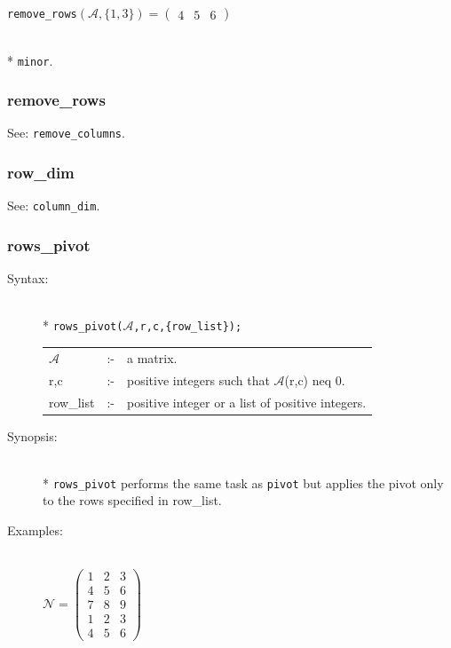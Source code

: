 {\begin{description}
\texttt{remove\_rows}\((\mathcal{A},\{1,3\}) =
        \begin{pmatrix} 4 & 5 & 6 \end{pmatrix}\)

\item[Related functions:]\mbox{}\\*
\texttt{minor}.
\end{description}


\subsubsection{remove\_rows}
\label{linalg:remove_rows}
\hypertarget{operator:REMOVE_ROWS}{}
See: \texttt{remove\_columns}.


\subsubsection{row\_dim}
\label{linalg:row_dim}
\hypertarget{operator:ROW_DIM}{}

See: \texttt{column\_dim}.


\subsubsection{rows\_pivot}
\label{linalg:rows_pivot}
\hypertarget{operator:ROWS_PIVOT}{}

\begin{description}
\item[Syntax:]\mbox{}\\*
{\tt rows\_pivot($\mathcal{A}$,r,c,\{row\_list\});}\\[2mm]
\begin{tabular}{l l l}
$\mathcal{A}$ &:-& a matrix. \\
r,c        &:-& positive integers such that $\mathcal{A}$(r,c) neq 0.\\
row\_list  &:-& positive integer or a list of positive integers.
\end{tabular}

\item[Synopsis:]\mbox{}\\*
\texttt{rows\_pivot} performs the same task as \texttt{pivot} but applies
the pivot only to the rows specified in row\_list.

\item[Examples:]\mbox{}\\
  \(\mathcal{N} = \begin{pmatrix} 1 & 2 & 3 \\ 4 & 5 & 6 \\ 7 & 8 &
    9 \\1 & 2 & 3 \\ 4 & 5 & 6 \end{pmatrix}\)


\end{description}}
